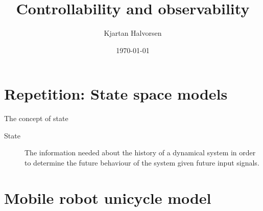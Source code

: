 \documentclass[presentation,aspectratio=169]{beamer}
\author{Kjartan Halvorsen}
\date{\today}
\title{Controllability and observability}
\begin{document}
\maketitle

\section{Repetition: State space models}
\label{sec:orgb6f47ab}
\begin{frame}[label={sec:org6566b62}]{The concept of state}
\begin{description}
\item[{State}] The information needed about the history of a dynamical system in order to determine the future behaviour of the system given future input signals.
\end{description}
\end{frame}

\section{Mobile robot unicycle model}
\label{sec:org0903872}
\end{document}
